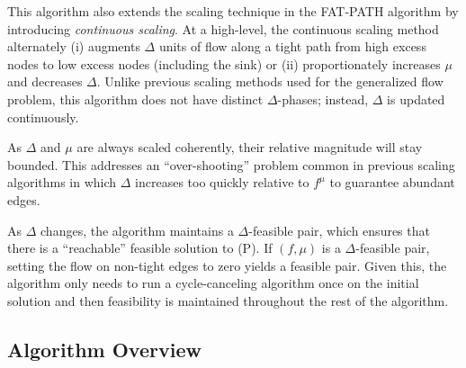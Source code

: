 \documentclass[11pt]{article}
\theoremstyle{definition}
\theoremstyle{definition}
\begin{document}
This algorithm also extends the scaling technique in the FAT-PATH algorithm
    \cite{Goldberg:1991:CAG:105014.105022} by introducing \textit{continuous scaling}.  At a high-level, the continuous scaling
    method alternately (i) augments $\Delta$ units of flow along a tight path from high
    excess nodes to low excess nodes (including the sink) or (ii) proportionately increases $\mu$ and
    decreases $\Delta$. Unlike previous scaling methods used for the generalized flow problem,
    this algorithm does not have distinct $\Delta$-phases; instead, $\Delta$ is updated continuously.
    
    As $\Delta$ and $\mu$ are always scaled coherently, their relative magnitude will stay bounded.
    This addresses an ``over-shooting'' problem common in previous scaling algorithms in which $\Delta$
    increases too quickly relative to $f^\mu$ to guarantee abundant edges.
    
    As $\Delta$ changes, the algorithm maintains a $\Delta$-feasible pair, which ensures that there is
    a ``reachable'' feasible solution to (P). If $(f,\mu)$ is a $\Delta$-feasible pair,
    setting the flow on non-tight edges to zero yields a feasible pair.
    Given this, the algorithm only needs to run a cycle-canceling
    algorithm once on the initial solution and then feasibility is maintained throughout the rest of
    the algorithm. 
    
	\subsection{Algorithm Overview} \label{sec:2013-overview}
	
\end{document}

